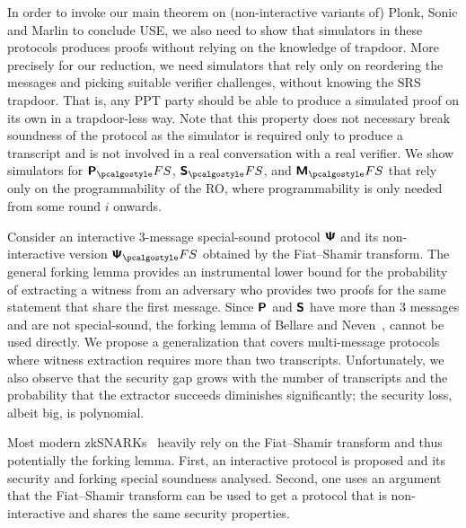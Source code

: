   In order to invoke our main theorem on
(non-interactive variants of) Plonk, Sonic and Marlin to conclude USE, we also need to show
that simulators in these protocols produces proofs without relying on the knowledge of
trapdoor. More precisely for our reduction, we need simulators that rely only on reordering the
messages and picking suitable verifier challenges, without knowing the SRS trapdoor.  That is,
any PPT party should be able to produce a simulated proof on its own in a trapdoor-less
way. Note that this property does not necessary break soundness of the protocol as the
simulator is required only to produce a transcript and is not involved in a real conversation
with a real verifier. We show simulators for $\plonkprotfs$, $\sonicprotfs$, and
$\marlinprotfs$ that rely only on the programmability of the RO, where programmability is only
needed from some round $i$ onwards.    

  Consider an interactive $3$-message
special-sound protocol $\bm{\mathsf{\Psi}}$ and its non-interactive version $\ps_\fs$ obtained by the
Fiat--Shamir transform. The general forking lemma provides an instrumental lower bound for the
probability of extracting a witness from an adversary who provides two proofs for the same
statement that share the first message. Since $\bm{\mathsf{P}}$ and $\bm{\mathsf{S}}$ have more than $3$
messages and are not special-sound, the forking lemma of Bellare and Neven~\cite{CCS:BelNev06},
cannot be used directly. We propose a generalization that covers multi-message protocols where
witness extraction requires more than two transcripts.  Unfortunately, we also observe
that the security gap grows with the number of transcripts and the probability that the
extractor succeeds diminishes significantly; the security loss, albeit big, is polynomial.

Most modern zkSNARKs~\cite{SP:BBBPWM18,CCS:MBKM19} heavily
rely on the Fiat--Shamir transform and thus potentially the forking lemma. First, an interactive
protocol is proposed and its security and forking special soundness analysed. Second,
one uses an argument that the Fiat--Shamir transform can be used to get a
protocol that is non-interactive and shares the same security properties.

